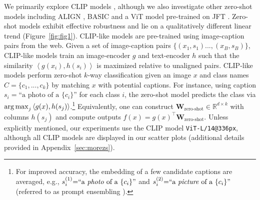   We primarily explore CLIP models \cite{radford2021learning}, although we also investigate other zero-shot models including ALIGN \cite{jia2021scaling}, BASIC \cite{pham2021scaling} and a ViT model pre-trained on JFT \cite{dosovitskiy2021an}. Zero-shot models exhibit effective robustness and lie on a qualitatively different linear trend (Figure~\ref{fig:fig1}). 
CLIP-like models are pre-trained using image-caption pairs from the web.
Given a set of image-caption pairs $\{(x_1,s_1)...,(x_B,s_B)\}$, CLIP-like models train an image-encoder $g$ and text-encoder $h$ such that the similarity $\left\langle g(x_i), h(s_i)\right\rangle$ is maximized relative to unaligned pairs.
CLIP-like models perform zero-shot $k$-way classification given an image $x$ and class names $C = \{c_1,...,c_k\}$ by matching $x$ with potential captions.
For instance, using caption $s_i = \text{``a photo of a \{$c_i$\}''}$ for each class $i$, the zero-shot model predicts the class via $\operatorname*{arg\,max}_j \left\langle g(x), h(s_j) \right\rangle$.\footnote{For improved accuracy, the embedding of a few candidate captions are averaged, e.g., $s_i^{(1)}{=}\text{``a \textit{photo} of a \{$c_i$\}''}$ and $s_i^{(2)}{=}\text{``a \textit{picture} of a \{$c_i$\}''}$ (referred to as prompt ensembling \cite{radford2021learning}).}
Equivalently, one can construct $\textbf{W}_{\text{zero-shot}} \in \mathbb{R}^{d \times k}$ with columns $h(s_j)$ and compute outputs $f(x) = g(x)^\top \textbf{W}_{\text{zero-shot}}$.
Unless explicitly mentioned, our experiments use the CLIP model \texttt{ViT-L/14@336px}, although all CLIP models are displayed in our scatter plots (additional details provided in Appendix~\ref{sec:morezs}).



